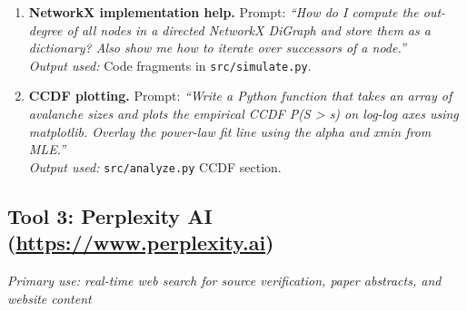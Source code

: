 \documentclass[12pt, a4paper]{article}
\begin{document}
\begin{enumerate}[label=\textbf{G\arabic*.}, leftmargin=*, itemsep=6pt]
  \item \textbf{NetworkX implementation help.}
  Prompt: \textit{``How do I compute the out-degree of all
  nodes in a directed NetworkX DiGraph and store them as a
  dictionary? Also show me how to iterate over successors of
  a node.''}\\
  \textit{Output used:} Code fragments in
  \texttt{src/simulate.py}.

  \item \textbf{CCDF plotting.}
  Prompt: \textit{``Write a Python function that takes an
  array of avalanche sizes and plots the empirical CCDF
  P(S > s) on log-log axes using matplotlib. Overlay the
  power-law fit line using the alpha and xmin from MLE.''}\\
  \textit{Output used:} \texttt{src/analyze.py} CCDF
  section.

\end{enumerate}

\subsection*{Tool 3: Perplexity AI (\url{https://www.perplexity.ai})}
\textit{Primary use: real-time web search for source verification,
paper abstracts, and website content}
\end{document}
